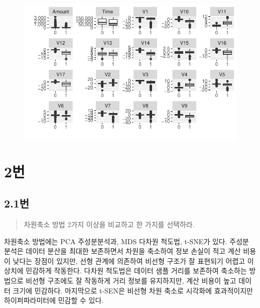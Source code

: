 \documentclass[
  letterpaper,
  DIV=11,
  numbers=noendperiod]{scrreprt}
\begin{document}
\begin{figure}[H]

{\centering \includegraphics{./test_27_files/figure-pdf/unnamed-chunk-4-1.pdf}

}

\end{figure}

\hypertarget{uxbc88-3}{%
\chapter*{2번}\label{uxbc88-3}}


\hypertarget{uxbc88-4}{%
\section*{2.1번}\label{uxbc88-4}}


\begin{quote}
차원축소 방법 2가지 이상을 비교하고 한 가지를 선택하라.
\end{quote}

차원축소 방법에는 PCA 주성분분석과, MDS 다차원 척도법, t-SNE가 있다.
주성분 분석은 데이터 분산을 최대한 보존하면서 차원을 축소하여 정보
손실이 적고 계산 비용이 낮다는 장점이 있지만, 선형 관계에 의존하여
비선형 구조가 잘 표현되기 어렵고 이상치에 민감하게 작동한다. 다차원
척도법은 데이터 샘플 거리를 보존하여 축소하는 방법으로 비선형 구조에도
잘 작동하게 거리 정보를 유지하지만, 계산 비용이 높고 데이터 크기에
민감하다. 마지막으로 t-SEN은 비선형 차원 축소로 시각화에 효과적이지만
하이퍼파라미터에 민감할 수 있다.
\end{document}
